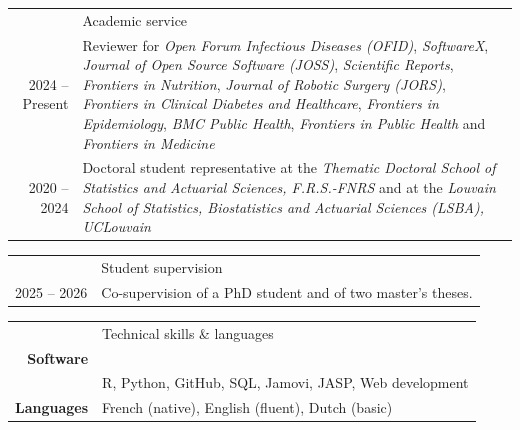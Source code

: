 \documentclass[letterpaper, 11pt]{article}
\newcommand{\headingfont}{\Large\color{OliveGreen}}
\newenvironment{SectionTable}[1]{
	\renewcommand*{\arraystretch}{1.7}
	\setlength{\tabcolsep}{10pt}
	\begin{longtable}{Rp{5.2in}} & #1 \\}
{\end{longtable}\vspace{-.3cm}}
\newenvironment{SectionTableSingleSpace}[1]{
	\renewcommand*{\arraystretch}{1.2}
	\setlength{\tabcolsep}{10pt}
	\begin{longtable}{Rp{5.2in}} & #1 \\[0.6em]}
{\end{longtable}\vspace{-.3cm}}
\begin{document}
\begin{SectionTable}{\headingfont Academic service}

2024 -- Present &
Reviewer for \textit{Open Forum Infectious Diseases (OFID)}, \textit{SoftwareX}, \textit{Journal of Open Source Software (JOSS)}, \textit{Scientific Reports}, \textit{Frontiers in Nutrition}, \textit{Journal of Robotic Surgery (JORS)}, \textit{Frontiers in Clinical Diabetes and Healthcare}, \textit{Frontiers in Epidemiology}, \textit{BMC Public Health}, \textit{Frontiers in Public Health} and \textit{Frontiers in Medicine} %
\\
2020 -- 2024 &
Doctoral student representative at the \textit{Thematic Doctoral School of Statistics and Actuarial Sciences, F.R.S.-FNRS} and at the \textit{Louvain School of Statistics, Biostatistics and Actuarial Sciences (LSBA), UCLouvain}
\end{SectionTable}

\begin{SectionTableSingleSpace}{\headingfont Student supervision}
2025 -- 2026 &
Co-supervision of a PhD student and of two master's theses.
\end{SectionTableSingleSpace}

\begin{SectionTable}{\headingfont Technical skills \& languages}
\textbf{Software}\\
& R, Python, GitHub, SQL, Jamovi, JASP, Web development \\

\textbf{Languages}
& French (native), English (fluent), Dutch (basic)
\end{SectionTable}



\newpage
\end{document}
